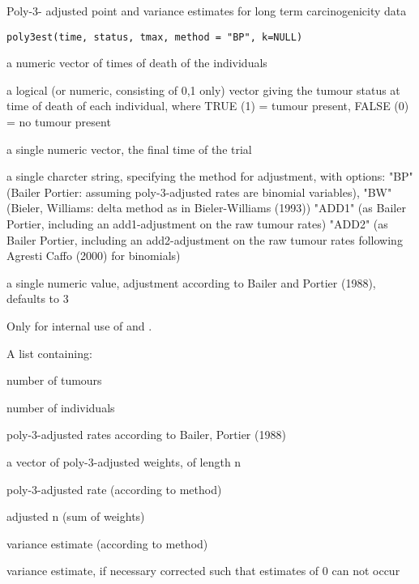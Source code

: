 \begin{Description}\relax
Poly-3- adjusted point and variance estimates for long term carcinogenicity data
\end{Description}
\begin{Usage}
\begin{verbatim}
poly3est(time, status, tmax, method = "BP", k=NULL)
\end{verbatim}
\end{Usage}
\begin{Arguments}
\begin{ldescription}
\item[\code{time}] a numeric vector of times of death of the individuals
\item[\code{status}] a logical (or numeric, consisting of 0,1 only) vector giving the tumour status at time of death of each individual,
where TRUE (1) = tumour present, FALSE (0) = no tumour present  
\item[\code{tmax}] a single numeric vector, the final time of the trial 
\item[\code{method}] a single charcter string, specifying the method for adjustment,
with options: "BP" (Bailer Portier: assuming poly-3-adjusted rates are binomial variables),
"BW" (Bieler, Williams: delta method as in Bieler-Williams (1993))
"ADD1" (as Bailer Portier, including an add1-adjustment on the raw tumour rates)
"ADD2" (as Bailer Portier, including an add2-adjustment on the raw tumour rates following Agresti Caffo (2000) for binomials)

\item[\code{k}] a single numeric value, adjustment according to Bailer and Portier (1988), defaults to 3
\end{ldescription}
\end{Arguments}
\begin{Details}\relax
Only for internal use of  and .
\end{Details}
\begin{Value}
A list containing:
\begin{ldescription}
\item[\code{Y }] number of tumours
\item[\code{n}] number of individuals
\item[\code{estimate}] poly-3-adjusted rates according to Bailer, Portier (1988)
\item[\code{weight}] a vector of poly-3-adjusted weights, of length n 
\item[\code{estp}] poly-3-adjusted rate (according to method)
\item[\code{nadj}] adjusted n (sum of weights)
\item[\code{varp}] variance estimate (according to method)
\item[\code{varcor}] variance estimate, if necessary corrected such that estimates of 0 can not occur
\end{ldescription}
\end{Value}
